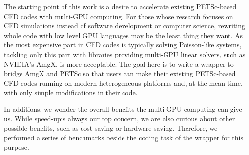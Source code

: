 The starting point of this work is a desire to 
accelerate existing PETSc-based CFD codes with multi-GPU computing.
For those whose research focuses on CFD simulations 
instead of software development or computer science,
rewriting whole code with low level GPU languages may be the least thing they want.
As the most expensive part in CFD codes is typically solving Poisson-like systems,
tackling only this part with libraries providing multi-GPU linear solvers, 
such as NVIDIA's AmgX,
is more acceptable.
The goal here is to write a wrapper to bridge AmgX and PETSc 
so that users can make their existing PETSc-based CFD codes running on modern heterogeneous platforms
and, at the mean time, with only simple modifications in their code.

In additions, we wonder the overall benefits the multi-GPU computing can give us.
While speed-up\footnotemark is always our top concern,
we are also curious about other possible benefits, such as cost saving or hardware saving.
Therefore, we performed a series of benchmarks beside the coding task of the wrapper for this purpose.

